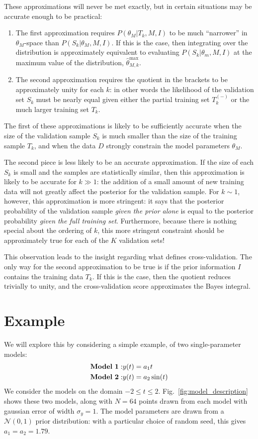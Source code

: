 \documentclass[12pt]{article}
\newcommand{\thetamax}[1]{\ensuremath{\hat{\theta}^{\max}_{#1}}}
\newcommand{\Tkminus}{\ensuremath{T_k^{(-)}}}
\newcommand{\fig}[1]{Fig.~\ref{fig:#1}}
\begin{document}
These approximations will never be met exactly, but in certain situations
may be accurate enough to be practical:
\begin{enumerate}
  \item The first approximation requires
    $P(\theta_M|T_k,M,I)$ to be much ``narrower''
    in $\theta_M$-space than $P(S_k|\theta_M, M, I)$.
    If this is the case, then integrating over the
    distribution is approximately equivalent to evaluating
    $P(S_k|\theta_m,M,I)$ at
    the maximum value of the distribution, \thetamax{M,k}.
  \item The second approximation requires the quotient in the brackets
    to be approximately unity for each $k$: in other words the likelihood
    of the validation set $S_k$ must be nearly equal given either
    the partial training set \Tkminus{} or the much larger training set
    $T_k$.
\end{enumerate}
The first of these approximations is likely to be sufficiently accurate
when the size of the validation sample $S_k$
is much smaller than the size of the training sample
$T_k$, and when the data $D$ strongly constrain the model parameters
$\theta_M$.

The second piece is less likely to be an accurate approximation.
If the size of each $S_k$ is small and the samples are statistically similar,
then this approximation is likely to be accurate for $k \gg 1$:
the addition of a small amount of new training data will not greatly
affect the posterior for the validation sample.
For $k \sim 1$, however, this approximation is more stringent:
it says that the
posterior probability of the validation sample {\it given the prior alone}
is equal to the posterior probability {\it given the full training set}.
Furthermore, because there is nothing special about the ordering of $k$,
this more stringent constraint should be approximately true for
each of the $K$ validation sets!

This observation leads to the insight regarding what defines cross-validation.
The only way for the second approximation to be true is if the prior
information $I$ contains the training data $T_k$.  If this is the case, then
the quotient reduces trivially to unity, and the cross-validation score
approximates the Bayes integral.

\section{Example}

We will explore this by considering a simple example, of two single-parameter
models:
\begin{eqnarray}
  {\rm \bf Model\ 1:} & y(t) = a_1t\\
  {\rm \bf Model\ 2:} & y(t) = a_2\sin(t)
\end{eqnarray}
We consider the models on the domain $-2 \le t \le 2$.  \fig{model_description}
shows these two models, along with $N=64$ points drawn from each model with
gaussian error of width $\sigma_y = 1$.  The model parameters are drawn from
a $\mathcal{N}(0, 1)$ prior distribution: with a particular choice of random
seed, this gives $a_1 = a_2 = 1.79$.
\end{document}
